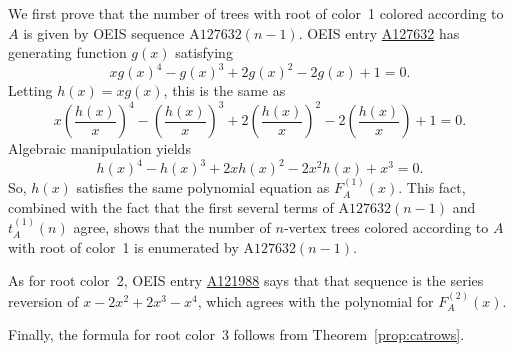 \documentclass[12pt]{amsart}
\newcommand{\seqnum}[1]{\href{https://oeis.org/#1}{#1}}
\newcommand{\gff}[2]{F_{#2}^{(#1)}(x)}
\newcommand{\gfa}[1]{\gff{#1}{A}}
\begin{document}
\begin{description}
\begin{itemize}
\end{itemize}
    \item[Discussion] We first prove that the number of trees with root of color~1 colored according to $A$ is given by OEIS sequence $\text{A127632}(n-1)$.
    OEIS entry \seqnum{A127632} has generating function $g(x)$ satisfying
    \[
    xg(x)^4-g(x)^3+2g(x)^2-2g(x)+1=0.
    \]
    Letting $h(x)=xg(x)$, this is the same as
    \[
    x\left(\frac{h(x)}{x}\right)^4-\left(\frac{h(x)}{x}\right)^3+2\left(\frac{h(x)}{x}\right)^2-2\left(\frac{h(x)}{x}\right)+1=0.
    \]
    Algebraic manipulation yields
    \[
    h(x)^4-h(x)^3+2xh(x)^2-2x^2h(x)+x^3=0.
    \]
    So, $h(x)$ satisfies the same polynomial equation as $\gfa{1}$. This fact, combined with the fact that the first several terms of $\text{A127632}(n-1)$ and $t_A^{(1)}(n)$ agree, shows that the number of $n$-vertex trees colored according to $A$ with root of color~1 is enumerated by $\text{A127632}(n-1)$.

    As for root color~2, 
    OEIS entry \seqnum{A121988} says that that sequence is the series reversion of $x-2x^2+2x^3-x^4$, which agrees with the polynomial for $\gfa{2}$.

    Finally, the formula for root color~3 follows from Theorem~\ref{prop:catrows}.
\end{description}
\end{document}
